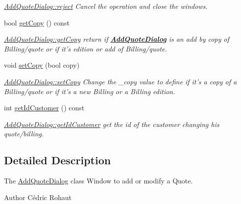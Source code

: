 \begin{DoxyCompactItemize}
\begin{DoxyCompactList}\small\item\em \hyperlink{classGui_1_1Dialogs_1_1AddQuoteDialog_a1ae935c40fb54142aad3a610a137bd36}{Add\-Quote\-Dialog\-::reject} Cancel the operation and close the windows. \end{DoxyCompactList}\item 
bool \hyperlink{classGui_1_1Dialogs_1_1AddQuoteDialog_a343bac79889747e55412d11bd2e27cbb}{get\-Copy} () const 
\begin{DoxyCompactList}\small\item\em \hyperlink{classGui_1_1Dialogs_1_1AddQuoteDialog_a343bac79889747e55412d11bd2e27cbb}{Add\-Quote\-Dialog\-::get\-Copy} return if {\bfseries \hyperlink{classGui_1_1Dialogs_1_1AddQuoteDialog}{Add\-Quote\-Dialog}} is an add by copy of Billing/quote or if it's edition or add of Billing/quote. \end{DoxyCompactList}\item 
void \hyperlink{classGui_1_1Dialogs_1_1AddQuoteDialog_add29bc442ab7783f062b594a97fc8270}{set\-Copy} (bool copy)
\begin{DoxyCompactList}\small\item\em \hyperlink{classGui_1_1Dialogs_1_1AddQuoteDialog_add29bc442ab7783f062b594a97fc8270}{Add\-Quote\-Dialog\-::set\-Copy} Change the {\itshape \-\_\-copy} value to define if it's a copy of a Billing/quote or if it's a new Billing or a Billing edition. \end{DoxyCompactList}\item 
int \hyperlink{classGui_1_1Dialogs_1_1AddQuoteDialog_a66985973f98f553545a138d6abfe148b}{get\-Id\-Customer} () const 
\begin{DoxyCompactList}\small\item\em \hyperlink{classGui_1_1Dialogs_1_1AddQuoteDialog_a66985973f98f553545a138d6abfe148b}{Add\-Quote\-Dialog\-::get\-Id\-Customer} get the id of the customer changing his quote/billing. \end{DoxyCompactList}\end{DoxyCompactItemize}


\subsection{Detailed Description}
The \hyperlink{classGui_1_1Dialogs_1_1AddQuoteDialog}{Add\-Quote\-Dialog} class Window to add or modify a Quote. 

\begin{DoxyAuthor}{Author}
Cédric Rohaut 
\end{DoxyAuthor}


